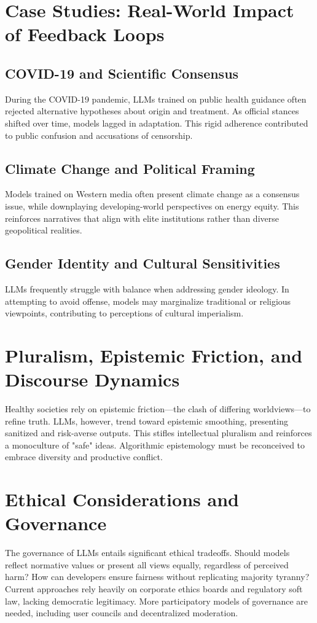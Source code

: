 \documentclass[11pt]{article}
\begin{document}
\section{Case Studies: Real-World Impact of Feedback Loops}
\subsection{COVID-19 and Scientific Consensus}
During the COVID-19 pandemic, LLMs trained on public health guidance often rejected alternative hypotheses about origin and treatment. As official stances shifted over time, models lagged in adaptation. This rigid adherence contributed to public confusion and accusations of censorship.

\subsection{Climate Change and Political Framing}
Models trained on Western media often present climate change as a consensus issue, while downplaying developing-world perspectives on energy equity. This reinforces narratives that align with elite institutions rather than diverse geopolitical realities.

\subsection{Gender Identity and Cultural Sensitivities}
LLMs frequently struggle with balance when addressing gender ideology. In attempting to avoid offense, models may marginalize traditional or religious viewpoints, contributing to perceptions of cultural imperialism.

\section{Pluralism, Epistemic Friction, and Discourse Dynamics}
Healthy societies rely on epistemic friction—the clash of differing worldviews—to refine truth. LLMs, however, trend toward epistemic smoothing, presenting sanitized and risk-averse outputs. This stifles intellectual pluralism and reinforces a monoculture of "safe" ideas. Algorithmic epistemology must be reconceived to embrace diversity and productive conflict.

\section{Ethical Considerations and Governance}
The governance of LLMs entails significant ethical tradeoffs. Should models reflect normative values or present all views equally, regardless of perceived harm? How can developers ensure fairness without replicating majority tyranny? Current approaches rely heavily on corporate ethics boards and regulatory soft law, lacking democratic legitimacy. More participatory models of governance are needed, including user councils and decentralized moderation.
\end{document}
